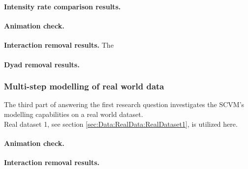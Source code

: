 \noindent \textbf{Intensity rate comparison results.}
\\\\
\textbf{Animation check.}
\\\\
\textbf{Interaction removal results.}
The 
\\\\
\textbf{Dyad removal results.}



\subsubsection{Multi-step modelling of real world data}
\label{sec:ResearchQuestion1:ResistanceTraining}
The third part of answering the first research question investigates the SCVM's modelling capabilities on a real world dataset.
\\
Real dataset 1, see section \ref{sec:Data:RealData:RealDataset1}, is utilized here.
\\\\
\textbf{Animation check.}
\\\\
\textbf{Interaction removal results.}



